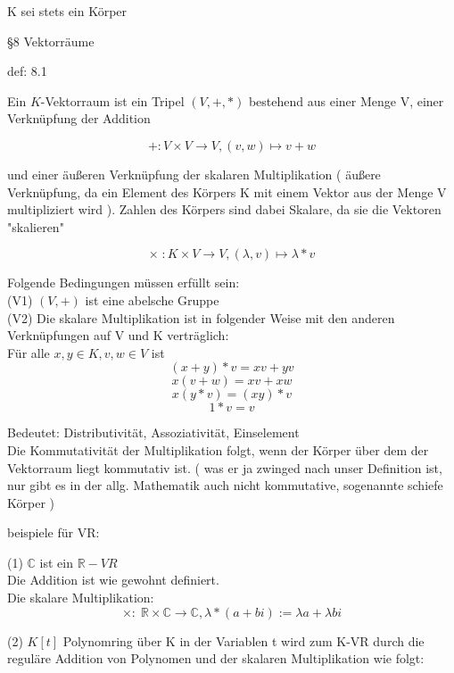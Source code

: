 \documentclass[headsepline,12pt,a4paper]{scrartcl}
\begin{document}
\item K sei stets ein Körper \\

\begin{center}
\item[§8 Vektorräume]
\end{center}

\item[def: 8.1]
\item Ein $K$-Vektorraum ist ein Tripel $(V,+,*)$ bestehend aus einer Menge V, einer Verknüpfung der Addition

$$ +:V \times V \rightarrow V, (v,w) \mapsto v+w $$ 

und einer äußeren Verknüpfung der skalaren Multiplikation ( äußere Verknüpfung, da ein Element des Körpers K mit einem Vektor aus der Menge V multipliziert wird ). Zahlen des Körpers sind dabei Skalare, da sie die Vektoren "skalieren"

$$ \times \; : K \times V \rightarrow V , ( \lambda , v ) \mapsto \lambda * v $$

Folgende Bedingungen müssen erfüllt sein: \\

(V1) $(V,+)$ ist eine abelsche Gruppe \\
(V2) Die skalare Multiplikation ist in folgender Weise mit den anderen Verknüpfungen auf V und K verträglich: \\

Für alle $x,y \in K , v,w \in V $ ist  \\
$$ (x+y) * v = xv+yv $$
$$ x(v+w) = xv+xw $$
$$ x(y*v) = (xy)*v $$
$$ 1*v=v$$

Bedeutet: Distributivität, Assoziativität, Einselement \\
Die Kommutativität der Multiplikation folgt, wenn der Körper über dem der Vektorraum liegt kommutativ ist. ( was er ja zwinged nach unser Definition ist, nur gibt es in der allg. Mathematik auch nicht kommutative, sogenannte schiefe Körper )


\item[beispiele für VR:]

(1) $\mathbb{C}$ ist ein $\mathbb{R}-VR$ \\
Die Addition ist wie gewohnt definiert. \\
Die skalare Multiplikation: 
$$ \times : \; \mathbb{R} \times \mathbb{C} \rightarrow \mathbb{C}, \lambda * (a+bi):= \lambda a + \lambda b i $$

(2) $K[t]$ Polynomring über K in der Variablen t wird zum K-VR durch die reguläre Addition von Polynomen und der skalaren Multiplikation wie folgt:
\end{document}
